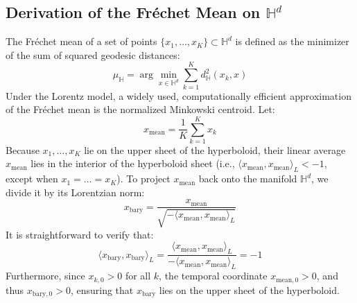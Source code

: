 \documentclass{article}
\theoremstyle{plain}
\theoremstyle{definition}
\theoremstyle{remark}
\begin{document}
\subsection{Derivation of the Fréchet Mean on $\mathbb{H}^d$}
The Fréchet mean of a set of points $\{x_1, \dots, x_K\} \subset \mathbb{H}^d$ is defined as the minimizer of the sum of squared geodesic distances:
$$\mu_{\mathbb{H}} = \arg\min_{x \in \mathbb{H}^d} \sum_{k=1}^K d_{\mathbb{H}}^2(x_k, x)$$
Under the Lorentz model, a widely used, computationally efficient approximation of the Fréchet mean is the normalized Minkowski centroid. Let:
$$x_{\text{mean}} = \frac{1}{K} \sum_{k=1}^K x_k$$
Because $x_1, \dots, x_K$ lie on the upper sheet of the hyperboloid, their linear average $x_{\text{mean}}$ lies in the interior of the hyperboloid sheet (i.e., $\langle x_{\text{mean}}, x_{\text{mean}} \rangle_L < -1$, except when $x_1 = \dots = x_K$). To project $x_{\text{mean}}$ back onto the manifold $\mathbb{H}^d$, we divide it by its Lorentzian norm:
$$x_{\text{bary}} = \frac{x_{\text{mean}}}{\sqrt{-\langle x_{\text{mean}}, x_{\text{mean}} \rangle_L}}$$
It is straightforward to verify that:
$$\langle x_{\text{bary}}, x_{\text{bary}} \rangle_L = \frac{\langle x_{\text{mean}}, x_{\text{mean}} \rangle_L}{-\langle x_{\text{mean}}, x_{\text{mean}} \rangle_L} = -1$$
Furthermore, since $x_{k, 0} > 0$ for all $k$, the temporal coordinate $x_{\text{mean}, 0} > 0$, and thus $x_{\text{bary}, 0} > 0$, ensuring that $x_{\text{bary}}$ lies on the upper sheet of the hyperboloid.
\end{document}
